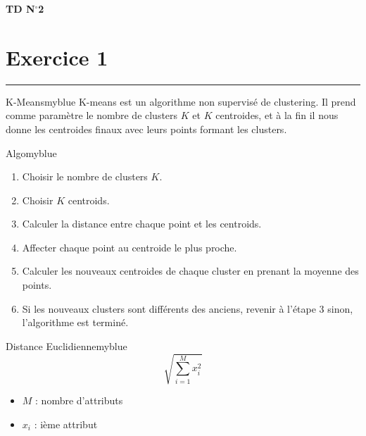 \documentclass{article}
\newcommand{\exer}[1]{
  \section*{Exercice #1}
  \vspace{-0.5cm}
  \noindent\rule{\textwidth}{0.5pt}%
}
\newcommand{\tit}[1]{
\begin{center}
    \Large{\textbf{{#1}}}
\end{center}
}
\begin{document}
\tit{TD N\(^{\boldsymbol{\circ}}\)\hspace{0.1cm}2}
\exer{1}

\vspace{0.25cm}


\begin{prettyBox}{K-Means}{myblue}
    K-means est un algorithme non supervisé de clustering. Il prend comme paramètre le nombre de 
    clusters $K$ et $K$ centroides, et à la fin il nous donne les centroides finaux avec leurs points 
    formant les clusters.
\end{prettyBox}

\vspace{0.15cm}

\begin{prettyBox}{Algo}{myblue}
    \begin{enumerate}
        \setlength{\itemsep}{0pt}
        \item Choisir le nombre de clusters $K$.
        \item Choisir $K$ centroids.
        \item Calculer la distance entre chaque point et les centroids.
        \item Affecter chaque point au centroide le plus proche.
        \item Calculer les nouveaux centroides de chaque cluster en prenant la moyenne des points.
        \item Si les nouveaux clusters sont différents des anciens, revenir à l'étape 3 sinon, l'algorithme est terminé.
    \end{enumerate}
\end{prettyBox}

\vspace{0.15cm}
\begin{prettyBox}{Distance Euclidienne}{myblue}
    \[ \sqrt{\sum_{i = 1}^M x_i^2} \]
    \begin{itemize}
        \setlength{\itemsep}{0pt}
        \item $M$ : nombre d'attributs
        \item $x_i$ : ième attribut
    \end{itemize}
\end{prettyBox}
\end{document}

